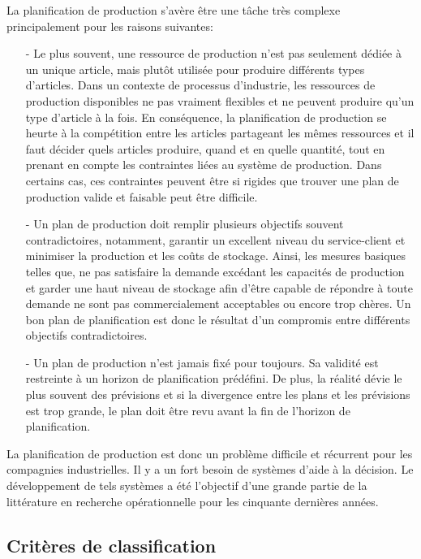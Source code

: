 \documentclass[12pt,a4paper]{article}
\begin{document}
 La planification de production s'avère être une tâche très complexe principalement pour les raisons suivantes:
 \begin{itemize}
 	\item[-] Le plus souvent, une ressource de production n'est pas seulement dédiée à un unique article, mais plutôt utilisée pour produire différents types d'articles. Dans un contexte de processus d'industrie, les ressources de production disponibles ne pas vraiment flexibles et ne peuvent produire qu'un type d'article à la fois. En conséquence, la planification de production se heurte à la compétition entre les articles partageant les mêmes ressources et il faut décider quels articles produire, quand et en quelle quantité, tout en prenant en compte les contraintes liées au système de production. Dans certains cas, ces contraintes peuvent être si rigides que trouver une plan de production valide et faisable peut être difficile.
 	
 	\item[-] Un plan de production doit remplir plusieurs objectifs souvent contradictoires, notamment, garantir un excellent niveau du service-client et minimiser la production et les coûts de stockage. Ainsi, les mesures basiques telles que, ne pas satisfaire la demande excédant les capacités de production et garder une haut niveau de stockage afin d'être capable de répondre à toute demande ne sont pas commercialement acceptables ou encore trop chères. Un bon plan de planification est donc le résultat d'un compromis entre différents objectifs contradictoires.
 	\item[-] Un plan de production n'est jamais fixé pour toujours. Sa validité est restreinte à un horizon de planification prédéfini. De plus, la réalité dévie le plus souvent des prévisions et si la divergence entre les plans et les prévisions est trop grande, le plan doit être revu avant la fin de l'horizon de planification.
 \end{itemize}
 
 La planification de production est donc un problème difficile et récurrent pour les compagnies industrielles. Il y a un fort besoin de systèmes d'aide à la décision. Le développement de tels systèmes a été l'objectif d'une grande partie de la littérature en recherche opérationnelle pour les cinquante dernières années. 
	
\subsection{Critères de classification}
\end{document}
